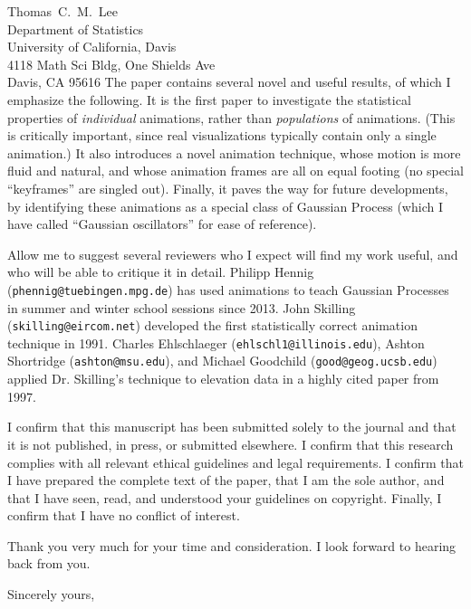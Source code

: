 \documentclass[11pt]{letter} %
\begin{document}
\begin{letter}{%
    Thomas~C.~M.~Lee \\
    Department of Statistics \\
    University of California, Davis  \\
    4118 Math Sci Bldg, One Shields Ave  \\
    Davis, CA 95616
}
The paper contains several novel and useful results, of which I emphasize the following.
It is the first paper to investigate the statistical properties of \textit{individual} animations, rather than \textit{populations} of animations.
(This is critically important, since real visualizations typically contain only a single animation.)
It also introduces a novel animation technique, whose motion is more fluid and natural, and whose animation frames are all on equal footing (no special ``keyframes'' are singled out).
Finally, it paves the way for future developments, by identifying these animations as a special class of Gaussian Process (which I have called ``Gaussian oscillators'' for ease of reference).

Allow me to suggest several reviewers who I expect will find my work useful, and who will be able to critique it in detail.
Philipp Hennig (\texttt{phennig@tuebingen.mpg.de}) has used animations to teach Gaussian Processes in summer and winter school sessions since 2013.
John Skilling (\texttt{skilling@eircom.net}) developed the first statistically correct animation technique in 1991.
Charles Ehlschlaeger (\texttt{ehlschl1@illinois.edu}), Ashton Shortridge (\texttt{ashton@msu.edu}), and Michael Goodchild (\texttt{good@geog.ucsb.edu}) applied Dr. Skilling's technique to elevation data in a highly cited paper from 1997.

I confirm that this manuscript has been submitted solely to the journal and that it is not published, in press, or submitted elsewhere.
I confirm that this research complies with all relevant ethical guidelines and legal requirements.
I confirm that I have prepared the complete text of the paper, that I am the sole author, and that I have seen, read, and understood your guidelines on copyright.
Finally, I confirm that I have no conflict of interest.

Thank you very much for your time and consideration.
I look forward to hearing back from you.

\closing{Sincerely yours,}




\end{letter}
\end{document}
